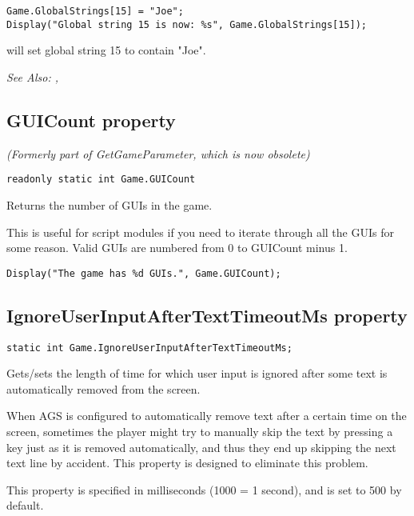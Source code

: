 \begin{verbatim}
Game.GlobalStrings[15] = "Joe";
Display("Global string 15 is now: %s", Game.GlobalStrings[15]);
\end{verbatim}
will set global string 15 to contain "Joe".

\it{See Also:} , 


\subsection{GUICount property}\label{Game.GUICount}%

\it{(Formerly part of GetGameParameter, which is now obsolete)}

\begin{verbatim}
readonly static int Game.GUICount
\end{verbatim}
Returns the number of GUIs in the game.

This is useful for script modules if you need to iterate through all the GUIs for some reason.
Valid GUIs are numbered from 0 to GUICount minus 1.

\begin{verbatim}
Display("The game has %d GUIs.", Game.GUICount);
\end{verbatim}


\subsection{IgnoreUserInputAfterTextTimeoutMs property}\label{Game.IgnoreUserInputAfterTextTimeoutMs}%

\begin{verbatim}
static int Game.IgnoreUserInputAfterTextTimeoutMs;
\end{verbatim}
Gets/sets the length of time for which user input is ignored after some text is automatically
removed from the screen.

When AGS is configured to automatically remove text after a certain time on the screen,
sometimes the player might try to manually skip the text by pressing a key just as it
is removed automatically, and thus they end up skipping the next text line by accident.
This property is designed to eliminate this problem.

This property is specified in milliseconds (1000 = 1 second), and is set to 500 by default.

